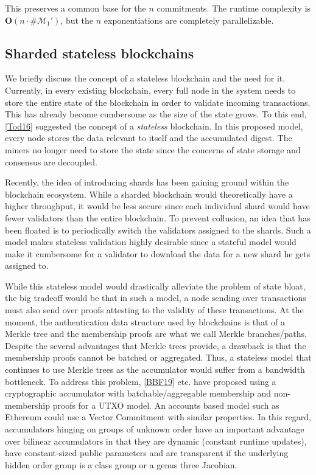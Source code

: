 \documentclass[11pt, lettersize, notitlepage, leqno, footskip=0.6cm]{article}
\newcommand{\mc}{\mathcal}
\newcommand{\mbf}{\mathbf}
\numberwithin{equation}{section}
\begin{document}
This preserves a common base for the $n$ commitments. The runtime complexity is $\mbf{O}(n\cdot \#\mc{M}_1')$, but the $n$ exponentiations are completely parallelizable.


\subsection{\fontsize{11}{11} \selectfont Sharded stateless blockchains}


We briefly discuss the concept of a stateless blockchain and the need for it. Currently, in every existing blockchain, every full node in the system needs to store the entire state of the blockchain in order to validate incoming transactions. This has already become cumbersome as the size of the state grows. To this end, \hyperlink{Tod}{[Tod16]} suggested the concept of a \textit{stateless} blockchain. In this proposed model, every node stores the data relevant to itself and the accumulated digest. The miners no longer need to store the state since the concerns of state storage and consensus are decoupled.

Recently, the idea of introducing shards has been gaining ground within the blockchain ecosystem. While a sharded blockchain would theoretically have a higher throughput, it would be less secure since each individual shard would have fewer validators than the entire blockchain. To prevent collusion, an idea that has been floated is to periodically switch the validators assigned to the shards. Such a model makes stateless validation highly desirable since a stateful model would make it cumbersome for a validator to download the data for a new shard he gets assigned to.

While this stateless model would drastically alleviate the problem of state bloat, the big tradeoff would be that in such a model, a node sending over transactions must also send over proofs attesting to the validity of these transactions. At the moment, the authentication data structure used by blockchains is that of a Merkle tree and the membership proofs are what we call Merkle branches/paths. Despite the several advantages that Merkle trees provide, a drawback is that the membership proofs cannot be batched or aggregated. Thus, a stateless model that continues to use Merkle trees as the accumulator would suffer from a bandwidth bottleneck. To address this problem, \hyperlink{BBF19}{[BBF19]} etc. have proposed using a cryptographic accumulator with batchable/aggregable membership and non-membership proofs for a UTXO model. An accounts based model such as Ethereum could use a Vector Commitment with similar properties. In this regard, accumulators hinging on groups of unknown order have an important advantage over bilinear accumulators in that they are dynamic (constant runtime updates), have constant-sized public parameters and are transparent if the underlying hidden order group is a class group or a genus three Jacobian.
\end{document}
